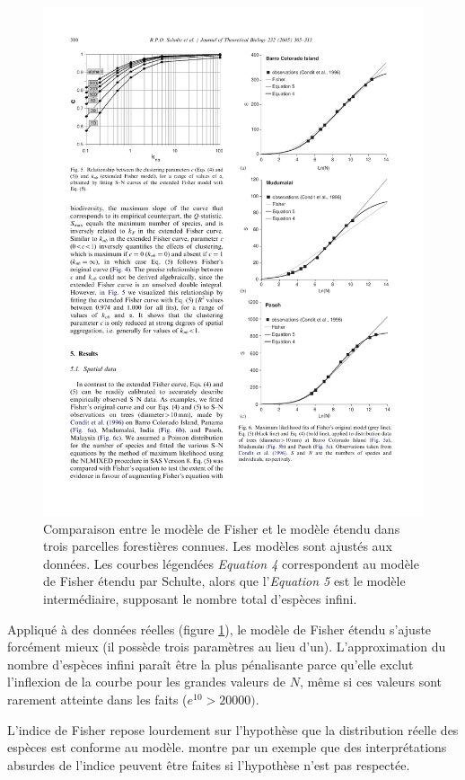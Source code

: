\documentclass[
  11pt,
  french,
  a4paper,
  extrafontsizes,onecolumn,openright
  ]{memoir}
\begin{document}
\scriptsize

\begin{figure}

{\centering \includegraphics[width=0.8\linewidth]{images/Schulte2005a} 

}

\caption{Comparaison entre le modèle de Fisher et le modèle étendu dans trois parcelles forestières connues. Les modèles sont ajustés aux données. Les courbes légendées \emph{Equation 4} correspondent au modèle de Fisher étendu par Schulte, alors que l'\emph{Equation 5} est le modèle intermédiaire, supposant le nombre total d'espèces infini.}\label{fig:Schulte2005a}
\end{figure}

\normalsize

Appliqué à des données réelles (figure \ref{fig:Schulte2005a}), le modèle de Fisher étendu s'ajuste forcément mieux (il possède trois paramètres au lieu d'un).
L'approximation du nombre d'espèces infini paraît être la plus pénalisante parce qu'elle exclut l'inflexion de la courbe pour les grandes valeurs de \(N\), même si ces valeurs sont rarement atteinte dans les faits (\(e^{10}>20000)\).

L'indice de Fisher repose lourdement sur l'hypothèse que la distribution réelle des espèces est conforme au modèle.
\textcite{Jost2007} montre par un exemple que des interprétations absurdes de l'indice peuvent être faites si l'hypothèse n'est pas respectée.
\end{document}
